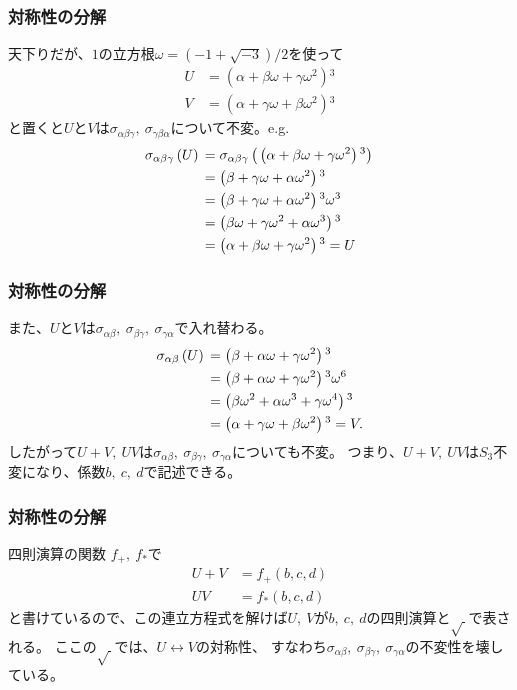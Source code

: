 \documentclass[12pt, t]{beamer}
\newcommand{\lr}[1]{\left({}#1\right){}}
\begin{document}
\begin{frame}
\frametitle{対称性の分解}
天下りだが、$1$の立方根$\omega = (-1 + \sqrt{-3})/2$を使って
\begin{align}
  U &= \lr{\alpha + \beta \omega + \gamma \omega^2}^3 \\
  V &= \lr{\alpha + \gamma \omega + \beta \omega^2}^3
\end{align}
と置くと$U$と$V$は$\sigma_{\alpha \beta \gamma},\ \sigma_{\gamma \beta \alpha}$について不変。e.g.
\begin{align}
  \sigma_{\alpha \beta \gamma}\lr{U} &= \sigma_{\alpha \beta \gamma}\lr{\lr{\alpha + \beta \omega + \gamma \omega^2}^3} \notag \\
                                     &= \lr{\beta + \gamma \omega + \alpha \omega^2}^3 \notag \\
                                     &= \lr{\beta + \gamma \omega + \alpha \omega^2}^3 \omega^3 \notag \\
                                     &= \lr{\beta \omega + \gamma \omega^2 + \alpha \omega^3}^3 \notag \\
                                     &= \lr{\alpha + \beta \omega + \gamma \omega^2}^3 = U
\end{align}
\end{frame}

\begin{frame}
\frametitle{対称性の分解}
また、$U$と$V$は$\sigma_{\alpha \beta},\ \sigma_{\beta \gamma},\ \sigma_{\gamma \alpha}$で入れ替わる。
\begin{align}
  \sigma_{\alpha \beta}\lr{U} &= \lr{\beta + \alpha \omega + \gamma \omega^2}^3 \notag \\
                              &= \lr{\beta + \alpha \omega + \gamma \omega^2}^3 \omega^6 \notag \\
                              &= \lr{\beta \omega^2+ \alpha \omega^3 + \gamma \omega^4}^3 \notag \\
                              &= \lr{\alpha + \gamma \omega + \beta \omega^2}^3 = V.
\end{align}
したがって$U + V,\ UV$は$\sigma_{\alpha \beta},\ \sigma_{\beta \gamma},\ \sigma_{\gamma \alpha}$についても不変。
つまり、$U + V,\ UV$は$S_3$不変になり、係数$b,\ c,\ d$で記述できる。
\end{frame}


\begin{frame}
\frametitle{対称性の分解}
四則演算の関数 $f_+,\ f_\ast$で
\begin{align}
  U + V &= f_+(b, c, d) \\
  U V &= f_\ast(b, c, d)
\end{align}
と書けているので、この連立方程式を解けば$U,\ V$が$b,\ c,\ d$の四則演算と$\sqrt{\ }$で表される。
ここの$\sqrt{\ }$では、$U \leftrightarrow V$の対称性、
すなわち$\sigma_{\alpha \beta},\ \sigma_{\beta \gamma},\ \sigma_{\gamma \alpha}$の不変性を壊している。
\end{frame}
\end{document}
